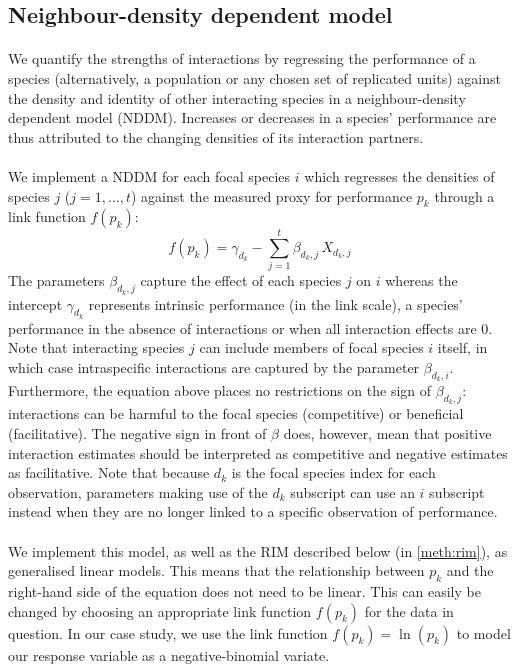 \documentclass[a4,12pt]{article}
\begin{document}
\begin{refsection}
    \subsection{Neighbour-density dependent model}
    \label{meth:nddm}    

        \paragraph{}
        We quantify the strengths of interactions by regressing the performance of a species (alternatively, a population or any chosen set of replicated units) against the density and identity of other interacting species in a neighbour-density dependent model (NDDM). Increases or decreases in a species' performance are thus attributed to the changing densities of its interaction partners. 

        \paragraph{}
        We implement a NDDM for each focal species $i$ which regresses the densities of species $j$ ($j = 1, ..., t$) against the measured proxy for performance $p_{k}$ through a link function $f(p_k)$:
        \begin{equation}
        f(p_{k}) = \gamma_{d_k} - \sum_{j=1}^{t} \beta_{d_k,j} \, X_{d_k,j}
        \label{nddm}
        \end{equation}
        The parameters $\beta_{d_k,j}$ capture the effect of each species $j$ on $i$ whereas the intercept $\gamma_{d_k}$ represents intrinsic performance (in the link scale), a species' performance in the absence of interactions or when all interaction effects are $0$. Note that interacting species $j$ can include members of focal species $i$ itself, in which case intraspecific interactions are captured by the parameter $\beta_{d_k,i}$. Furthermore, the equation above places no restrictions on the sign of $\beta_{d_k, j}$: interactions can be harmful to the focal species (competitive) or beneficial (facilitative). The negative sign in front of $\beta$ does, however, mean that positive interaction estimates should be interpreted as competitive and negative estimates as facilitative. Note that because $d_k$ is the focal species index for each observation, parameters making use of the $d_k$ subscript can use an $i$ subscript instead when they are no longer linked to a specific observation of performance.

        \paragraph{}
        We implement this model, as well as the RIM described below (in \ref{meth:rim}), as generalised linear models. This means that the relationship between $p_k$ and the right-hand side of the equation does not need to be linear. This can easily be changed by choosing an appropriate link function $f(p_k)$ for the data in question. In our case study, we use the link function $f(p_k) = \ln(p_k)$ to model our response variable as a negative-binomial variate.
              


\end{refsection}
\end{document}
